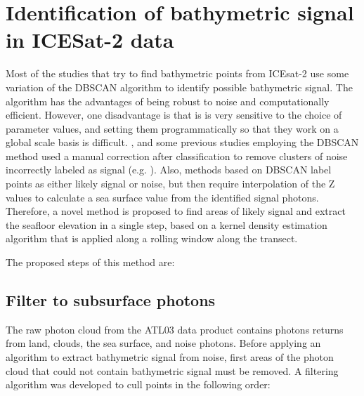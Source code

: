 \section{Identification of bathymetric signal in ICESat-2 data} \label{sec:kdesignalfinding}
Most of the studies that try to find bathymetric points from ICEsat-2 use some variation of the DBSCAN algorithm to identify possible bathymetric signal. The algorithm has the advantages of being robust to noise \cite{} and computationally efficient. However, one disadvantage is that is is very sensitive to the choice of parameter values, and setting them programmatically so that they work on a global scale basis is difficult. , and some previous studies employing the DBSCAN method used a manual correction after classification to remove clusters of noise incorrectly labeled as signal (e.g. \cite{Ma2020}). Also, methods based on DBSCAN label points as either likely signal or noise, but then require interpolation of the Z values to calculate a sea surface value from the identified signal photons. Therefore, a novel  method is proposed to find areas of likely signal and extract the seafloor elevation in a single step, based on a kernel density estimation algorithm that is applied along a rolling window along the transect.

The proposed steps of this method are:
\subsection{Filter to subsurface photons}

The raw photon cloud from the ATL03 data product contains photons returns from land, clouds, the sea surface, and noise photons. Before applying an algorithm to extract bathymetric signal from noise, first areas of the photon cloud that could not contain bathymetric signal must be removed. A filtering algorithm was developed to cull points in the following order:

